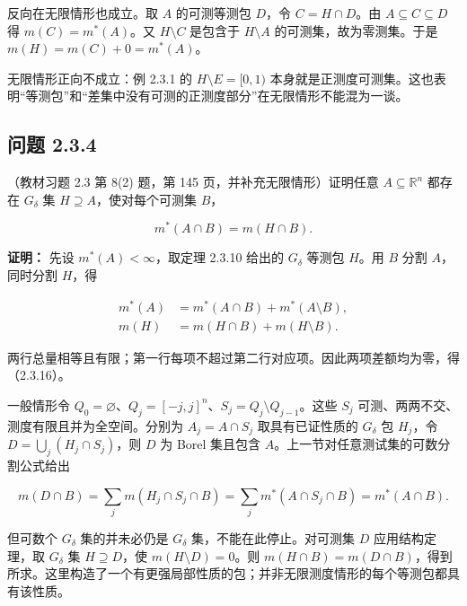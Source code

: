 \documentclass[11pt,a4paper]{article}
\begin{document}
反向在无限情形也成立。取 \(A\) 的可测等测包 \(D\)，令 \(C=H\cap D\)。由
\(A\subseteq C\subseteq D\) 得 \(m(C)=m^*(A)\)。又 \(H\setminus C\)
是包含于 \(H\setminus A\) 的可测集，故为零测集。于是
\(m(H)=m(C)+0=m^*(A)\)。

无限情形正向不成立：例 2.3.1 的 \(H\setminus E=[0,1)\)
本身就是正测度可测集。这也表明``等测包''和``差集中没有可测的正测度部分''在无限情形不能混为一谈。

\subsection{问题 2.3.4}\label{ux95eeux9898-2.3.4}

（教材习题 2.3 第 8(2) 题，第 145 页，并补充无限情形）证明任意
\(A\subseteq\mathbb R^n\) 都存在 \(G_\delta\) 集
\(H\supseteq A\)，使对每个可测集 \(B\)，

\begin{equation*}
m^*(A\cap B)=m(H\cap B).
\tag{2.3.16}
\end{equation*}

\textbf{证明：} 先设 \(m^*(A)<\infty\)，取定理 2.3.10 给出的
\(G_\delta\) 等测包 \(H\)。用 \(B\) 分割 \(A\)，同时分割 \(H\)，得

\begin{equation*}
\begin{aligned}
m^*(A)&=m^*(A\cap B)+m^*(A\setminus B),\\
m(H)&=m(H\cap B)+m(H\setminus B).
\end{aligned}
\tag{2.3.17}
\end{equation*}

两行总量相等且有限；第一行每项不超过第二行对应项。因此两项差额均为零，得（2.3.16）。

一般情形令
\(Q_0=\varnothing\)、\(Q_j=[-j,j]^n\)、\(S_j=Q_j\setminus Q_{j-1}\)。这些
\(S_j\) 可测、两两不交、测度有限且并为全空间。分别为 \(A_j=A\cap S_j\)
取具有已证性质的 \(G_\delta\) 包 \(H_j\)，令
\(D=\bigcup_j(H_j\cap S_j)\)，则 \(D\) 为 Borel 集且包含
\(A\)。上一节对任意测试集的可数分割公式给出

\begin{equation*}
m(D\cap B)=\sum_jm(H_j\cap S_j\cap B)
=\sum_jm^*(A\cap S_j\cap B)=m^*(A\cap B).
\tag{2.3.18}
\end{equation*}

但可数个 \(G_\delta\) 集的并未必仍是 \(G_\delta\)
集，不能在此停止。对可测集 \(D\) 应用结构定理，取 \(G_\delta\) 集
\(H\supseteq D\)，使 \(m(H\setminus D)=0\)。则
\(m(H\cap B)=m(D\cap B)\)，得到所求。这里构造了一个有更强局部性质的包；并非无限测度情形的每个等测包都具有该性质。
\end{document}
